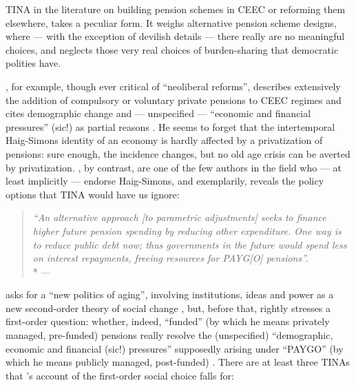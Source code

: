 TINA in the literature on building pension schemes in \gls{CEEC} or reforming them elsewhere, takes a peculiar form.
It weighs alternative pension scheme designs, where --- with the exception of devilish details --- there really are no meaningful choices, and neglects those very real choices of burden-sharing that democratic polities have.

\citeauthor{Cerami2009a}, for example, though ever critical of ``neoliberal reforms'', describes extensively the addition of compulsory or voluntary private pensions to \gls{CEEC} regimes and cites demographic change and --- unspecified --- ``economic and financial pressures'' (sic!) as partial reasons \citeyearpar[336]{Cerami2009a}.
He seems to forget that the intertemporal Haig-Simons identity of an economy is hardly affected by a privatization of pensions:
sure enough, the incidence changes, but no old age crisis can be averted by privatization.
\cite{Barr2005a}, by contrast, are one of the few authors in the field who --- at least implicitly --- endorse Haig-Simons, and exemplarily, reveals the policy options that TINA would have us ignore:
\begin{quote}
	\emph{``An alternative approach [to parametric adjustments] seeks to finance higher future pension spending by reducing other expenditure.
	One way is to reduce public debt now;
thus governments in the future would spend less on interest repayments, freeing resources for PAYG[O] pensions''.}
	\\*
	--- \citet[152]{Barr2005a}
\end{quote}

\citeauthor{Cerami2009a} asks for a ``new politics of aging'', involving institutions, ideas and power as a new second-order theory of social change \citeyearpar[338]{Cerami2009a}, but, before that, rightly stresses a first-order question:
whether, indeed, ``funded'' (by which he means privately managed, pre-funded) pensions really resolve the (unspecified) ``demographic, economic and financial (sic!) pressures'' supposedly arising under ``PAYGO'' (by which he means publicly managed, post-funded) \citeyearpar[339]{Cerami2009a}.
There are at least three TINAs that \citeauthor{Cerami2009a}'s account of the first-order social choice falls for:

